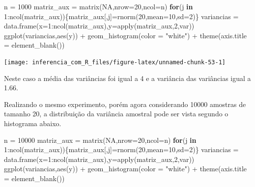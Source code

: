 \documentclass[
]{book}
\newenvironment{Shaded}{\begin{snugshade}}{\end{snugshade}}
\newcommand{\AttributeTok}[1]{\textcolor[rgb]{0.77,0.63,0.00}{#1}}
\newcommand{\ConstantTok}[1]{\textcolor[rgb]{0.00,0.00,0.00}{#1}}
\newcommand{\ControlFlowTok}[1]{\textcolor[rgb]{0.13,0.29,0.53}{\textbf{#1}}}
\newcommand{\DecValTok}[1]{\textcolor[rgb]{0.00,0.00,0.81}{#1}}
\newcommand{\FunctionTok}[1]{\textcolor[rgb]{0.00,0.00,0.00}{#1}}
\newcommand{\NormalTok}[1]{#1}
\newcommand{\OtherTok}[1]{\textcolor[rgb]{0.56,0.35,0.01}{#1}}
\newcommand{\SpecialCharTok}[1]{\textcolor[rgb]{0.00,0.00,0.00}{#1}}
\newcommand{\StringTok}[1]{\textcolor[rgb]{0.31,0.60,0.02}{#1}}
\begin{document}
\begin{Shaded}
\begin{Highlighting}[]
\NormalTok{n }\OtherTok{=} \DecValTok{1000}
\NormalTok{matriz\_aux }\OtherTok{=} \FunctionTok{matrix}\NormalTok{(}\ConstantTok{NA}\NormalTok{,}\AttributeTok{nrow=}\DecValTok{20}\NormalTok{,}\AttributeTok{ncol=}\NormalTok{n)}
\ControlFlowTok{for}\NormalTok{(j }\ControlFlowTok{in} \DecValTok{1}\SpecialCharTok{:}\FunctionTok{ncol}\NormalTok{(matriz\_aux))\{matriz\_aux[,j]}\OtherTok{=}\FunctionTok{rnorm}\NormalTok{(}\DecValTok{20}\NormalTok{,}\AttributeTok{mean=}\DecValTok{10}\NormalTok{,}\AttributeTok{sd=}\DecValTok{2}\NormalTok{)\}}
\NormalTok{variancias }\OtherTok{=} \FunctionTok{data.frame}\NormalTok{(}\AttributeTok{x=}\DecValTok{1}\SpecialCharTok{:}\FunctionTok{ncol}\NormalTok{(matriz\_aux),}\AttributeTok{y=}\FunctionTok{apply}\NormalTok{(matriz\_aux,}\DecValTok{2}\NormalTok{,var))}
\FunctionTok{ggplot}\NormalTok{(variancias,}\FunctionTok{aes}\NormalTok{(y)) }\SpecialCharTok{+}
  \FunctionTok{geom\_histogram}\NormalTok{(}\AttributeTok{color =} \StringTok{"white"}\NormalTok{) }\SpecialCharTok{+}
  \FunctionTok{theme}\NormalTok{(}\AttributeTok{axis.title =} \FunctionTok{element\_blank}\NormalTok{())}
\end{Highlighting}
\end{Shaded}

\begin{center}\texttt{[image: inferencia\_com\_R\_files/figure-latex/unnamed-chunk-53-1]} \end{center}

Neste caso a média das variâncias foi igual a 4 e a variância das variâncias igual a 1.66.

Realizando o mesmo experimento, porém agora considerando 10000 amostras de tamanho 20, a distribuição da variância amostral pode ser vista segundo o histograma abaixo.

\begin{Shaded}
\begin{Highlighting}[]
\NormalTok{n }\OtherTok{=} \DecValTok{10000}
\NormalTok{matriz\_aux }\OtherTok{=} \FunctionTok{matrix}\NormalTok{(}\ConstantTok{NA}\NormalTok{,}\AttributeTok{nrow=}\DecValTok{20}\NormalTok{,}\AttributeTok{ncol=}\NormalTok{n)}
\ControlFlowTok{for}\NormalTok{(j }\ControlFlowTok{in} \DecValTok{1}\SpecialCharTok{:}\FunctionTok{ncol}\NormalTok{(matriz\_aux))\{matriz\_aux[,j]}\OtherTok{=}\FunctionTok{rnorm}\NormalTok{(}\DecValTok{20}\NormalTok{,}\AttributeTok{mean=}\DecValTok{10}\NormalTok{,}\AttributeTok{sd=}\DecValTok{2}\NormalTok{)\}}
\NormalTok{variancias }\OtherTok{=} \FunctionTok{data.frame}\NormalTok{(}\AttributeTok{x=}\DecValTok{1}\SpecialCharTok{:}\FunctionTok{ncol}\NormalTok{(matriz\_aux),}\AttributeTok{y=}\FunctionTok{apply}\NormalTok{(matriz\_aux,}\DecValTok{2}\NormalTok{,var))}
\FunctionTok{ggplot}\NormalTok{(variancias,}\FunctionTok{aes}\NormalTok{(y)) }\SpecialCharTok{+}
  \FunctionTok{geom\_histogram}\NormalTok{(}\AttributeTok{color =} \StringTok{"white"}\NormalTok{) }\SpecialCharTok{+}
  \FunctionTok{theme}\NormalTok{(}\AttributeTok{axis.title =} \FunctionTok{element\_blank}\NormalTok{())}
\end{Highlighting}
\end{Shaded}
\end{document}
